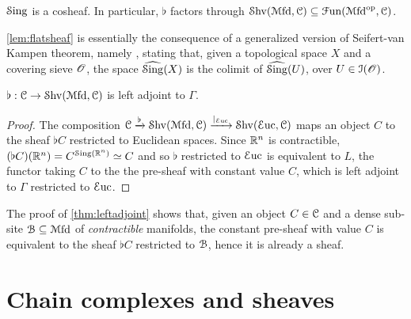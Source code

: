 \documentclass[10pt]{amsart}
\begin{document}
\begin{lemma}\label{lem:flatsheaf}
  $\mathcal{S}\mathrm{ing}$ is a cosheaf. In particular,
  $\flat$ factors through $\mathcal{S}\mathrm{hv}(\mathcal{M}\mathrm{fd},\mathcal{C})\subseteq\mathcal{F}\mathrm{un}(\mathcal{M}\mathrm{fd}^{\mathrm{op}},\mathcal{C})$.
\end{lemma}
\cref{lem:flatsheaf} is essentially the consequence of a generalized version of Seifert-van Kampen theorem, namely \cite[Proposition A.3.2]{lurie2017ha}, stating that, given a topological space $X$ and a covering sieve $\mathscr{O}$, the space $\widehat{\mathcal{S}\mathrm{ing}}(X)$ is the colimit of $\widehat{\mathcal{S}\mathrm{ing}}(U)$, over $U\in\mathcal{I}(\mathscr{O})$.
\begin{theorem}\label{thm:leftadjoint}
  $\flat:\mathcal{C}\to\mathcal{S}\mathrm{hv}(\mathcal{M}\mathrm{fd},\mathcal{C})$ is left adjoint to $\Gamma$.
\end{theorem}
\begin{proof}
  The composition $\mathcal{C}\xrightarrow{\flat}\mathcal{S}\mathrm{hv}(\mathcal{M}\mathrm{fd},\mathcal{C})\xrightarrow{|_{\mathcal{E}\mathrm{uc}}}\mathcal{S}\mathrm{hv}(\mathcal{E}\mathrm{uc},\mathcal{C})$ maps an object $C$ to the sheaf $\flat C$ restricted to Euclidean spaces. Since $\mathbb{R}^n$ is contractible, $(\flat C)(\mathbb{R}^n)=C^{\mathcal{S}\mathrm{ing}(\mathbb{R}^n)}\simeq C$ and so $\flat$ restricted to $\mathcal{E}\mathrm{uc}$ is equivalent to $L$, the functor taking $C$ to the the pre-sheaf with constant value $C$, which is left adjoint to $\Gamma$ restricted to $\mathcal{E}\mathrm{uc}$.
\end{proof}
\begin{remark}\label{rmk:constsheaf}
  The proof of \cref{thm:leftadjoint} shows that, given an object $C\in\mathcal{C}$ and a dense sub-site $\mathcal{B}\subseteq\mathcal{M}\mathrm{fd}$ of \emph{contractible} manifolds, the constant pre-sheaf with value $C$ is equivalent to the sheaf $\flat C$ restricted to $\mathcal{B}$, hence it is already a sheaf. 
\end{remark}

\section{Chain complexes and sheaves}
\end{document}
